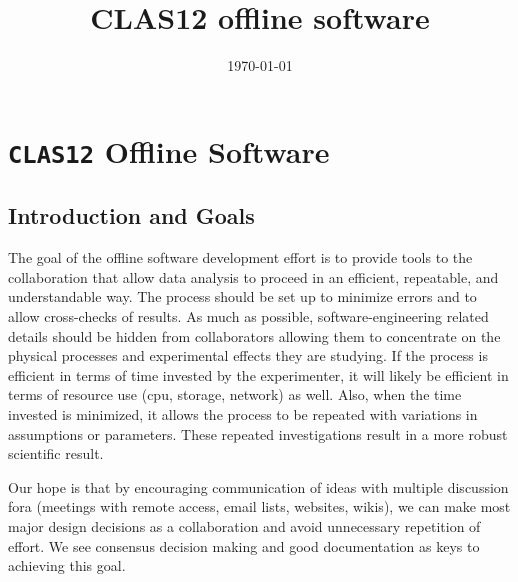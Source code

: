 \documentclass[12pt]{article}
\title{CLAS12 offline software}
\date{\today}
\begin{document}
\maketitle 
\newpage

\renewcommand{\headrulewidth}{0pt}
\renewcommand{\footrulewidth}{0pt}
\pagestyle{myheading}


\section{{\tt CLAS12} Offline Software}

\subsection{Introduction and Goals}

The goal of the offline software development effort is to provide tools to 
the collaboration that allow data analysis to proceed in an efficient, 
repeatable, and understandable way. The process should be set up to minimize 
errors and to allow cross-checks of results. As much as possible, 
software-engineering related details should be hidden from collaborators 
allowing them to concentrate on the physical processes and experimental 
effects they are studying. If the process is efficient in terms of time 
invested by the experimenter, it will likely be efficient in terms of resource 
use (cpu, storage, network) as well. Also, when the time invested is minimized,
it allows the process to be repeated with variations in assumptions or 
parameters. These repeated investigations result in a more robust scientific 
result.

Our hope is that by encouraging communication of ideas with multiple 
discussion fora (meetings with remote access, email lists, websites, wikis), 
we can make most major design decisions as a collaboration and avoid 
unnecessary repetition of effort. We see consensus decision making and good 
documentation as keys to achieving this goal.
\end{document}
